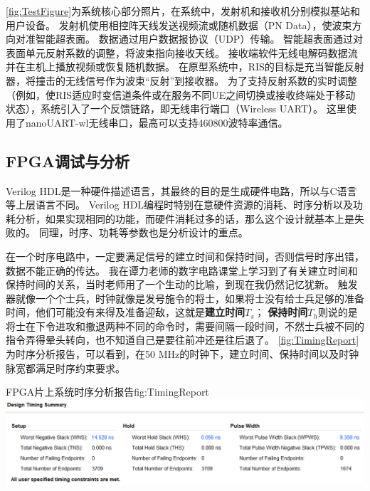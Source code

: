 \documentclass[supercite]{HustGraduPaper}
\begin{document}
\autoref{fig:TestFigure}为系统核心部分照片，在系统中，发射机和接收机分别模拟基站和用户设备。
发射机使用相控阵天线发送视频流或随机数据（PN Data），使波束方向对准智能超表面。
数据通过用户数据报协议（UDP）传输。
智能超表面通过对表面单元反射系数的调整，将波束指向接收天线。
接收端软件无线电解码数据流并在主机上播放视频或恢复随机数据。
在原型系统中，RIS的目标是充当智能反射器，将撞击的无线信号作为波束“反射”到接收器。
为了支持反射系数的实时调整（例如，使RIS适应时变信道条件或在服务不同UE之间切换或接收终端处于移动状态），系统引入了一个反馈链路，即无线串行端口（Wireless UART）。
这里使用了nanoUART-wl无线串口，最高可以支持460800波特率通信。

\subsection{FPGA调试与分析}

Verilog HDL是一种硬件描述语言，其最终的目的是生成硬件电路，所以与C语言等上层语言不同。
Verilog HDL编程时特别在意硬件资源的消耗、时序分析以及功耗分析，如果实现相同的功能，而硬件消耗过多的话，那么这个设计就基本上是失败的。
同理，时序、功耗等参数也是分析设计的重点。

在一个时序电路中，一定要满足信号的建立时间和保持时间，否则信号时序出错，数据不能正确的传达。
我在谭力老师的数字电路课堂上学习到了有关建立时间和保持时间的关系，当时老师用了一个生动的比喻，到现在我仍然记忆犹新。
触发器就像一个个士兵，时钟就像是发号施令的将士，如果将士没有给士兵足够的准备时间，他们可能没有来得及准备迎敌，这就是{\bfseries 建立时间$T_s$}；
{\bfseries 保持时间$T_h$}则说的是将士在下令进攻和撤退两种不同的命令时，需要间隔一段时间，不然士兵被不同的指令弄得晕头转向，也不知道自己是要往前冲还是往后退了。
\autoref{fig:TimingReport}为时序分析报告，可以看到，在50 MHz的时钟下，建立时间、保持时间以及时钟脉宽都满足时序约束要求。

\begin{generalfig}[htb]{FPGA片上系统时序分析报告}{fig:TimingReport}
	\includegraphics[width=\linewidth]{Figures/TimingReport.png}
\end{generalfig}
\end{document}

